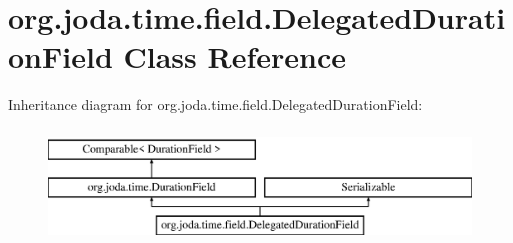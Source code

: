 \hypertarget{classorg_1_1joda_1_1time_1_1field_1_1_delegated_duration_field}{\section{org.\-joda.\-time.\-field.\-Delegated\-Duration\-Field Class Reference}
\label{classorg_1_1joda_1_1time_1_1field_1_1_delegated_duration_field}
}
Inheritance diagram for org.\-joda.\-time.\-field.\-Delegated\-Duration\-Field\-:\begin{figure}[H]
\begin{center}
\leavevmode
\includegraphics[height=3.000000cm]{classorg_1_1joda_1_1time_1_1field_1_1_delegated_duration_field}
\end{center}
\end{figure}
